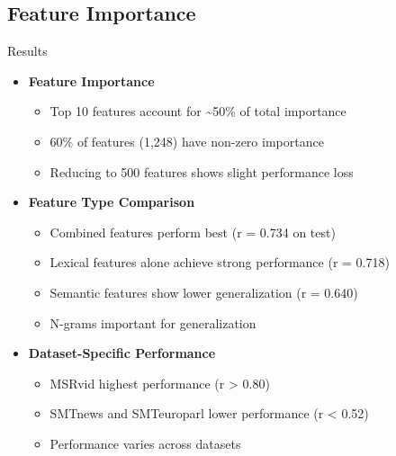\documentclass{beamer}
\begin{document}
\subsection{Feature Importance}
\begin{frame}{Results}
    \begin{itemize}
        \item \textbf{Feature Importance}
        \begin{itemize}
            \item Top 10 features account for \textasciitilde{}50\% of total importance
            \item 60\% of features (1,248) have non-zero importance
            \item Reducing to 500 features shows slight performance loss
        \end{itemize}
        \item \textbf{Feature Type Comparison}
        \begin{itemize}
            \item Combined features perform best (r = 0.734 on test)
            \item Lexical features alone achieve strong performance (r = 0.718)
            \item Semantic features show lower generalization (r = 0.640)
            \item N-grams important for generalization
        \end{itemize}
        \item \textbf{Dataset-Specific Performance}
        \begin{itemize}
            \item MSRvid highest performance (r \textgreater{} 0.80)
            \item SMTnews and SMTeuroparl lower performance (r \textless{} 0.52)
            \item Performance varies across datasets
        \end{itemize}
    \end{itemize}
\end{frame}
\end{document}
